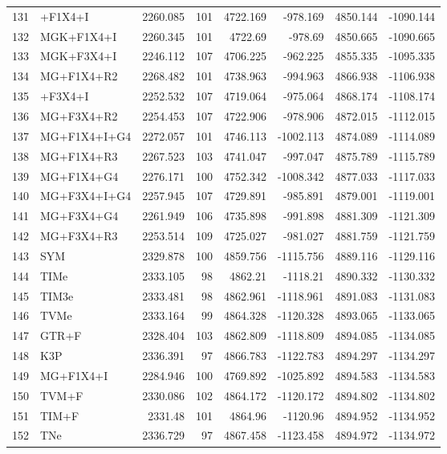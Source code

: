 \documentclass[12pt]{article}
\begin{document}
\begin{longtable}{clrrrrrr}
	131 & \gy+F1X4+I & 2260.085 & 101 & 4722.169 & -978.169 & 4850.144 & -1090.144 \\ 
	132 & MGK+F1X4+I & 2260.345 & 101 & 4722.69 & -978.69 & 4850.665 & -1090.665 \\ 
	133 & MGK+F3X4+I & 2246.112 & 107 & 4706.225 & -962.225 & 4855.335 & -1095.335 \\ 
	134 & MG+F1X4+R2 & 2268.482 & 101 & 4738.963 & -994.963 & 4866.938 & -1106.938 \\ 
	135 & \gy+F3X4+I & 2252.532 & 107 & 4719.064 & -975.064 & 4868.174 & -1108.174 \\ 
	136 & MG+F3X4+R2 & 2254.453 & 107 & 4722.906 & -978.906 & 4872.015 & -1112.015 \\ 
	137 & MG+F1X4+I+G4 & 2272.057 & 101 & 4746.113 & -1002.113 & 4874.089 & -1114.089 \\ 
	138 & MG+F1X4+R3 & 2267.523 & 103 & 4741.047 & -997.047 & 4875.789 & -1115.789 \\ 
	139 & MG+F1X4+G4 & 2276.171 & 100 & 4752.342 & -1008.342 & 4877.033 & -1117.033 \\ 
	140 & MG+F3X4+I+G4 & 2257.945 & 107 & 4729.891 & -985.891 & 4879.001 & -1119.001 \\ 
	141 & MG+F3X4+G4 & 2261.949 & 106 & 4735.898 & -991.898 & 4881.309 & -1121.309 \\ 
	142 & MG+F3X4+R3 & 2253.514 & 109 & 4725.027 & -981.027 & 4881.759 & -1121.759 \\ 
	143 & SYM & 2329.878 & 100 & 4859.756 & -1115.756 & 4889.116 & -1129.116 \\ 
	144 & TIMe & 2333.105 & 98 & 4862.21 & -1118.21 & 4890.332 & -1130.332 \\ 
	145 & TIM3e & 2333.481 & 98 & 4862.961 & -1118.961 & 4891.083 & -1131.083 \\ 
	146 & TVMe & 2333.164 & 99 & 4864.328 & -1120.328 & 4893.065 & -1133.065 \\ 
	147 & GTR+F & 2328.404 & 103 & 4862.809 & -1118.809 & 4894.085 & -1134.085 \\ 
	148 & K3P & 2336.391 & 97 & 4866.783 & -1122.783 & 4894.297 & -1134.297 \\ 
	149 & MG+F1X4+I & 2284.946 & 100 & 4769.892 & -1025.892 & 4894.583 & -1134.583 \\ 
	150 & TVM+F & 2330.086 & 102 & 4864.172 & -1120.172 & 4894.802 & -1134.802 \\ 
	151 & TIM+F & 2331.48 & 101 & 4864.96 & -1120.96 & 4894.952 & -1134.952 \\ 
	152 & TNe & 2336.729 & 97 & 4867.458 & -1123.458 & 4894.972 & -1134.972 \\ 

\end{longtable}
\end{document}
